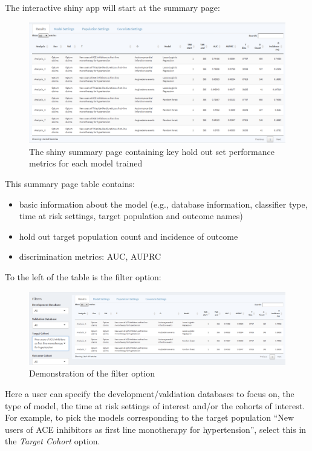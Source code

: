 \documentclass[11pt]{book}
\providecommand{\tightlist}{%
  \setlength{\itemsep}{0pt}\setlength{\parskip}{0pt}}
\theoremstyle{definition}
\theoremstyle{definition}
\theoremstyle{definition}
\theoremstyle{remark}
\begin{document}
The interactive shiny app will start at the summary page:

\begin{figure}

{\centering \includegraphics[width=0.8\linewidth]{images/PatientLevelPrediction/shiny/shinySummary} 

}

\caption{The shiny summary page containing key hold out set performance metrics for each model trained}\label{fig:shinySummary}
\end{figure}

This summary page table contains:

\begin{itemize}
\tightlist
\item
  basic information about the model (e.g., database information, classifier type, time at risk settings, target population and outcome names)
\item
  hold out target population count and incidence of outcome
\item
  discrimination metrics: AUC, AUPRC
\end{itemize}

To the left of the table is the filter option:

\begin{figure}

{\centering \includegraphics[width=0.8\linewidth]{images/PatientLevelPrediction/shiny/shinyFilter} 

}

\caption{Demonstration of the filter option}\label{fig:shinyFilter}
\end{figure}

Here a user can specify the development/valdiation databases to focus on, the type of model, the time at risk settings of interest and/or the cohorts of interest. For example, to pick the models corresponding to the target population ``New users of ACE inhibitors as first line monotherapy for hypertension'', select this in the \emph{Target Cohort} option.
\end{document}
